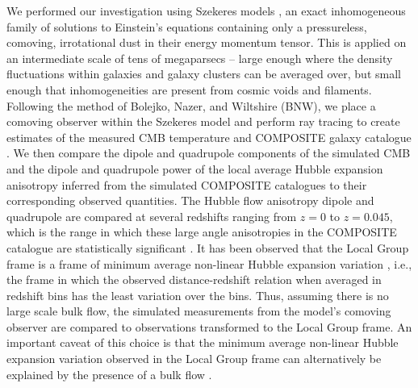\documentclass[a4paper,12pt]{report}
\begin{document}
We performed our investigation using Szekeres models \cite{RN20,RN19}, an exact inhomogeneous family of solutions to Einstein's equations containing only a pressureless, comoving, irrotational dust in their energy momentum tensor. This is applied on an intermediate scale of tens of megaparsecs -- large enough where the density fluctuations within galaxies and galaxy clusters can be averaged over, but small enough that inhomogeneities are present from cosmic voids and filaments. Following the method of Bolejko, Nazer, and Wiltshire \cite{RN3} (BNW), we place a comoving observer within the Szekeres model and perform ray tracing to create estimates of the measured CMB temperature and COMPOSITE galaxy catalogue \cite{RN82,RN183}. We then compare the dipole and quadrupole components of the simulated CMB and the dipole and quadrupole power of the local average Hubble expansion anisotropy inferred from the simulated COMPOSITE catalogues to their corresponding observed quantities. The Hubble flow anisotropy dipole and quadrupole are compared at several redshifts ranging from $z=0$ to $z=0.045$, which is the range in which these large angle anisotropies in the COMPOSITE catalogue are statistically significant \cite{RN3}. It has been observed that the Local Group frame is a frame of minimum average non-linear Hubble expansion variation \cite{RN35,RN40}, i.e., the frame in which the observed distance-redshift relation when averaged in redshift bins has the least variation over the bins. Thus, assuming there is no large scale bulk flow, the simulated measurements from the model's comoving observer are compared to observations transformed to the Local Group frame. An important caveat of this choice is that the minimum average non-linear Hubble expansion variation observed in the Local Group frame can alternatively be explained by the presence of a bulk flow \cite{RN122}.
\end{document}
